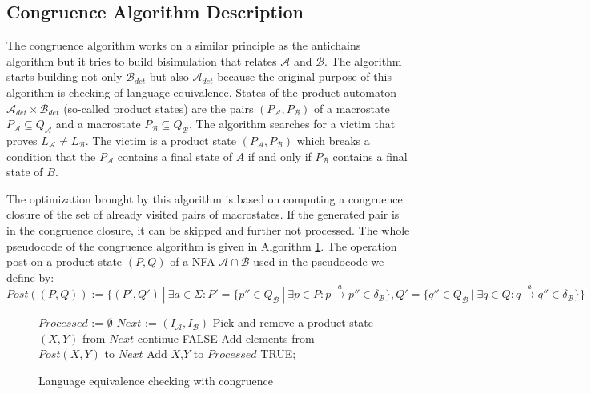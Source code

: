  \subsection{Congruence Algorithm Description}
\label{subsectCongr}
The congruence algorithm works on a similar principle as the antichains algorithm but  %
it tries to build bisimulation that relates $\mathcal{A}$ and $\mathcal{B}$. The algorithm starts building not only $\mathcal{B}_{det}$ 
but also $\mathcal{A}_{det}$ because the original purpose of this algorithm is checking of 
language equivalence. States of the product automaton $\mathcal{A}_{det} \times \mathcal{B}_{det}$  (so-called product states) are the pairs 
$(P_\mathcal{A},P_\mathcal{B})$ of a macrostate $P_\mathcal{A} \subseteq Q_\mathcal{A}$ and a macrostate
$P_\mathcal{B} \subseteq Q_\mathcal{B}$. 
The algorithm searches for a victim that proves $L_\mathcal{A} \neq L_\mathcal{B}$. The victim is a product state $(P_\mathcal{A},P_\mathcal{B})$ 
which breaks a condition that
the $P_\mathcal{A}$ contains a final state of $A$ if and only if $P_\mathcal{B}$ contains a final state of $B$. 

The optimization brought by this algorithm is based on computing a congruence closure of the set of already visited pairs of macrostates. 
If the generated pair is in the congruence closure, it can be skipped and further not processed.
The whole pseudocode of the congruence algorithm is given in Algorithm \ref{algCongr}. The operation post on a product state $(P,Q)$ of a 
NFA $\mathcal{A}\cap \mathcal{B}$ used in the pseudocode we define by:\
$Post((P,Q)):=\{(P',Q')\ |\ \exists a \in \Sigma: P'=
\{p''\in Q_\mathcal{B}\ |\ \exists p \in P:p\xrightarrow{a} p''\in \delta_\mathcal{B}\}, Q'=
\{q''\in Q_\mathcal{B}\ |\ \exists q \in Q:q\xrightarrow{a} q''\in \delta_\mathcal{B}\}\}$


\begin{figure}[ht]
	\begin{algorithm}[H]
		\label{algCongr}
		\KwOut{TRUE, if $L_\mathcal{A}=L_\mathcal{B}$. Otherwise FALSE.}
			$Processed$ := $\emptyset$\;
			$Next$ := $(I_\mathcal{A},I_\mathcal{B})$\;
			{
				Pick and remove a product state $(X,Y)$ from $Next$\;
				{continue\;}
				{
					\Return FALSE\;
				}
					Add elements from $Post(X,Y)$ to $Next$\;
				Add $X$,$Y$ to $Processed$\;
			}
			\Return TRUE;
		\caption{Language equivalence checking with congruence}
\end{algorithm}
\end{figure}

